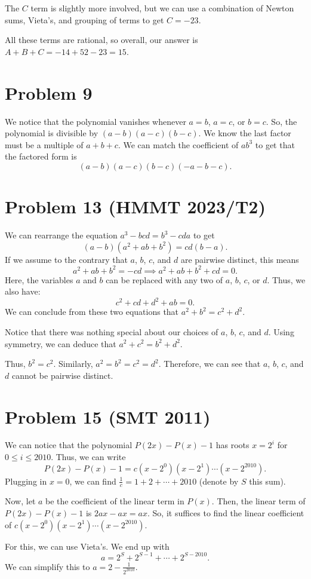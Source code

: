 \documentclass{scrartcl}
\begin{document}
The $C$ term is slightly more involved, but we can use a combination of Newton sums, Vieta's, and grouping of terms to get $C = -23$.

All these terms are rational, so overall, our answer is $A + B + C = -14 + 52 - 23 = 15$.
\section*{Problem 9}
We notice that the polynomial vanishes whenever $a=b$, $a=c$, or $b=c$. So, the polynomial is divisible by $(a-b)(a-c)(b-c)$. We know the last factor must be a multiple of $a+b+c$. We can match the coefficient of $ab^3$ to get that the factored form is
\[
    (a-b)(a-c)(b-c)(-a-b-c).
\]
\section*{Problem 13 (HMMT 2023/T2)}
We can rearrange the equation $a^3 - bcd = b^3 - cda$ to get
\[
    (a - b)(a^2 + ab + b^2) = cd(b - a).
\]
If we assume to the contrary that $a$, $b$, $c$, and $d$ are pairwise distinct, this means
\[
    a^2 + ab + b^2 = -cd \implies a^2 + ab + b^2 + cd = 0.
\]
Here, the variables $a$ and $b$ can be replaced with any two of $a$, $b$, $c$, or $d$. Thus, we also have:
\[
    c^2 + cd + d^2 + ab = 0.
\]
We can conclude from these two equations that $a^2 + b^2 = c^2 + d^2$.

Notice that there was nothing special about our choices of $a$, $b$, $c$, and $d$. Using symmetry, we can deduce that $a^2 + c^2 = b^2 + d^2$.

Thus, $b^2 = c^2$. Similarly, $a^2 = b^2 = c^2 = d^2$. Therefore, we can see that $a$, $b$, $c$, and $d$ cannot be pairwise distinct.
\section*{Problem 15 (SMT 2011)}
We can notice that the polynomial $P(2x) - P(x) - 1$ has roots $x = 2^i$ for $0 \leq i \leq 2010$.
Thus, we can write
\[
    P(2x) - P(x) - 1 = c(x - 2^0)(x - 2^1)\cdots(x - 2^{2010}).
\]
Plugging in $x = 0$, we can find $\frac{1}{c} = 1 + 2 + \cdots + 2010$ (denote by $S$ this sum).

Now, let $a$ be the coefficient of the linear term in $P(x)$. Then, the linear term of $P(2x) - P(x) - 1$ is $2ax - ax = ax$. So, it suffices to find the linear coefficient of $c(x - 2^0)(x - 2^1)\cdots(x - 2^{2010})$.

For this, we can use Vieta's. We end up with
\[
    a = 2^S + 2^{S-1} + \cdots + 2^{S - 2010}.
\]
We can simplify this to $a = 2 - \frac{1}{2^{2010}}.$
\end{document}
